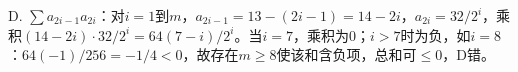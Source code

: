 \begin{solutions}
D. $\sum a_{2i-1}a_{2i}$：对$i=1$到$m$，$a_{2i-1}=13-(2i-1)=14-2i$，$a_{2i}=32/2^i$，乘积$(14-2i)\cdot32/2^i=64(7-i)/2^i$。当$i=7$，乘积为0；$i>7$时为负，如$i=8$：$64(-1)/256=-1/4<0$，故存在$m\geq8$使该和含负项，总和可$\leq0$，D错。
\end{solutions}